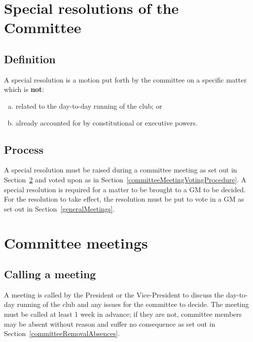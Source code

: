\documentclass{constitution}
\begin{document}
\section{Special resolutions of the Committee}\label{specialResolutionsCommittee}

\subsection{Definition}
A special resolution is a motion put forth by the committee on a specific matter which is \textbf{not}:
\begin{enumerate}[(a)]
    \item related to the day-to-day running of the club; or
    \item already accounted for by constitutional or executive powers.
\end{enumerate}

\subsection{Process}
A special resolution must be raised during a committee meeting as set out in Section~\ref{committeeMeetings} and voted upon as in Section~\ref{committeeMeetingVotingProcedure}. A special resolution is required for a matter to be brought to a GM to be decided.
For the resolution to take effect, the resolution must be put to vote in a GM as set out in Section~\ref{generalMeetings}.

\section{Committee meetings}\label{committeeMeetings}

\subsection{Calling a meeting}
A meeting is called by the President or the Vice-President to discuss the day-to-day running of the club and any issues for the committee to decide. The meeting must be called at least 1 week in advance; if they are not, committee members may be absent without reason and suffer no consequence as set out in Section~\ref{committeeRemovalAbsences}.
\end{document}

